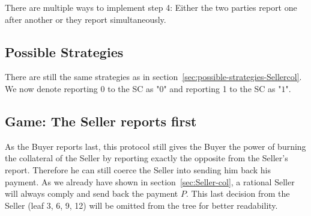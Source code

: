 \documentclass{cacthesis}
\begin{document}
There are multiple ways to implement step 4: Either the two parties report one after another or they report simultaneously.
\subsection{Possible Strategies}
\label{sec:possible-strategies-Sellercol-bothreport}
There are still the same strategies as in section~\ref{sec:possible-strategies-Sellercol}. We now denote reporting 0 to the SC as "$0$" and reporting 1 to the SC as "$1$".

\subsection{Game: The Seller reports first}
As the Buyer reports last, this protocol still gives the Buyer the power of
burning the collateral of the Seller by reporting exactly the opposite from the
Seller's report.
Therefore he can still coerce the Seller into sending him back his payment. As we already have shown in section~\ref{sec:Seller-col}, a rational
Seller will always comply and send back the payment $P$. This last decision from the Seller (leaf 3, 6, 9, 12) will be
omitted from the tree for better readability.\newline
\end{document}
